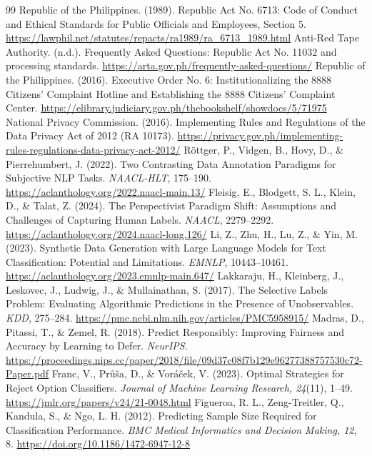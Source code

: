 \begin{thebibliography}{99}
 Republic of the Philippines. (1989). Republic Act No. 6713: Code of Conduct and Ethical Standards for Public Officials and Employees, Section 5. \url{https://lawphil.net/statutes/repacts/ra1989/ra_6713_1989.html}
 Anti-Red Tape Authority. (n.d.). Frequently Asked Questions: Republic Act No. 11032 and processing standards. \url{https://arta.gov.ph/frequently-asked-questions/}
 Republic of the Philippines. (2016). Executive Order No. 6: Institutionalizing the 8888 Citizens' Complaint Hotline and Establishing the 8888 Citizens' Complaint Center. \url{https://elibrary.judiciary.gov.ph/thebookshelf/showdocs/5/71975}
 National Privacy Commission. (2016). Implementing Rules and Regulations of the Data Privacy Act of 2012 (RA 10173). \url{https://privacy.gov.ph/implementing-rules-regulations-data-privacy-act-2012/}
 R\"ottger, P., Vidgen, B., Hovy, D., \& Pierrehumbert, J. (2022). Two Contrasting Data Annotation Paradigms for Subjective NLP Tasks. \emph{NAACL-HLT}, 175--190. \url{https://aclanthology.org/2022.naacl-main.13/}
 Fleisig, E., Blodgett, S. L., Klein, D., \& Talat, Z. (2024). The Perspectivist Paradigm Shift: Assumptions and Challenges of Capturing Human Labels. \emph{NAACL}, 2279--2292. \url{https://aclanthology.org/2024.naacl-long.126/}
 Li, Z., Zhu, H., Lu, Z., \& Yin, M. (2023). Synthetic Data Generation with Large Language Models for Text Classification: Potential and Limitations. \emph{EMNLP}, 10443--10461. \url{https://aclanthology.org/2023.emnlp-main.647/}
 Lakkaraju, H., Kleinberg, J., Leskovec, J., Ludwig, J., \& Mullainathan, S. (2017). The Selective Labels Problem: Evaluating Algorithmic Predictions in the Presence of Unobservables. \emph{KDD}, 275--284. \url{https://pmc.ncbi.nlm.nih.gov/articles/PMC5958915/}
 Madras, D., Pitassi, T., \& Zemel, R. (2018). Predict Responsibly: Improving Fairness and Accuracy by Learning to Defer. \emph{NeurIPS}. \url{https://proceedings.nips.cc/paper/2018/file/09d37c08f7b129e96277388757530c72-Paper.pdf}
 Franc, V., Pr\r{u}\v{s}a, D., \& Vor\'a\v{c}ek, V. (2023). Optimal Strategies for Reject Option Classifiers. \emph{Journal of Machine Learning Research, 24}(11), 1--49. \url{https://jmlr.org/papers/v24/21-0048.html}
 Figueroa, R. L., Zeng-Treitler, Q., Kandula, S., \& Ngo, L. H. (2012). Predicting Sample Size Required for Classification Performance. \emph{BMC Medical Informatics and Decision Making, 12}, 8. \url{https://doi.org/10.1186/1472-6947-12-8}

\end{thebibliography}
